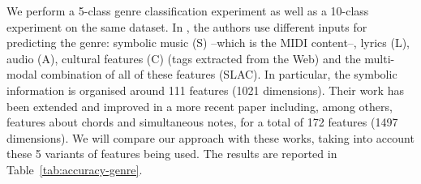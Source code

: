 \documentclass{article}
\newcommand{\tabref}[1]{\mbox{Table~\ref{#1}}}
\begin{document}

We perform a 5-class genre classification experiment as well as a 10-class experiment on the same dataset. In \citep{mckay2010datasetslac}, the authors use different inputs for predicting the genre: symbolic music (S) --which is the MIDI content--, lyrics (L), audio (A), cultural features (C) (tags extracted from the Web) and the multi-modal combination of all of these features (SLAC). In particular, the symbolic information is organised around 111 features (1021 dimensions). Their work has been extended and improved in a more recent paper \citep{mckay2018} including, among others, features about chords and simultaneous notes, for a total of 172 features (1497 dimensions). We will compare our approach with these works, taking into account these 5 variants of features being used.
 The results are reported in \tabref{tab:accuracy-genre}. 
\end{document}
